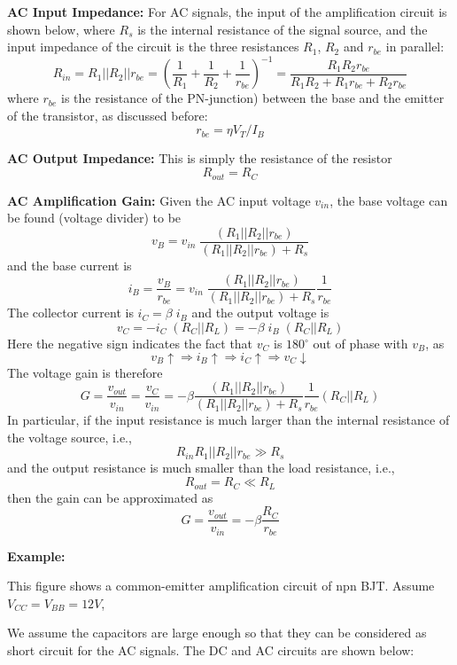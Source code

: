 
{\bf AC Input Impedance:} For AC signals, the input of the amplification
circuit is shown below, where $R_s$ is the internal resistance of the signal 
source, and the input impedance of the circuit is the three resistances $R_1$, 
$R_2$ and $r_{be}$ in parallel:
\[	R_{in}=R_1||R_2||r_{be}
	=(\frac{1}{R_1}+\frac{1}{R_2}+\frac{1}{r_{be}})^{-1}
	=\frac{R_1 R_2 r_{be}}{R_1R_2+R_1r_{be}+R_2r_{be}}	\]
where $r_{be}$ is the resistance of the PN-junction) between the base and 
the emitter of the transistor, as discussed before:
\[	r_{be}=\eta V_T/I_B	\]

{\bf AC Output Impedance:} This is simply the resistance of the resistor 
\[	R_{out}=R_C	\]

{\bf AC Amplification Gain:} Given the AC input voltage $v_{in}$, the base
voltage can be found (voltage divider) to be
\[	v_B=v_{in}\; \frac{(R_1||R_2||r_{be})}{(R_1||R_2||r_{be})+R_s}	\]
and the base current is
\[	i_B=\frac{v_B}{r_{be}}=v_{in}\;\frac{(R_1||R_2||r_{be})}{(R_1||R_2||r_{be})+R_s}\frac{1}{r_{be}}		\]
The collector current is $i_C=\beta \;i_B$ and the output voltage is
\[	v_C=-i_C\;(R_C||R_L)=-\beta\;i_B\;(R_C||R_L)	\]
Here the negative sign indicates the fact that $v_C$ is $180^\circ$ out of
phase with $v_B$, as 
\[	v_B \uparrow \Longrightarrow i_B \uparrow \Longrightarrow i_C \uparrow
	\Longrightarrow v_C \downarrow	\]
The voltage gain is therefore
\[
G=\frac{v_{out}}{v_{in}}=\frac{v_C}{v_{in}}=
	-\beta \frac{(R_1||R_2||r_{be})}{(R_1||R_2||r_{be})+R_s}
	\frac{1}{r_{be}}(R_C||R_L)	\]
In particular, if the input resistance is much larger than the internal 
resistance of the voltage source, i.e., 
\[	R_{in} R_1||R_2||r_{be} \gg  R_s	\]
and the output resistance is much smaller than the load resistance, i.e.,
\[	R_{out}=R_C \ll R_L	\]
then the gain can be approximated as
\[	G=\frac{v_{out}}{v_{in}}=-\beta \frac{R_C}{r_{be}}	\]

{\bf Example:} 


This figure shows a common-emitter amplification circuit of npn BJT. Assume
$V_{CC}=V_{BB}=12V$, 

We assume the capacitors are large enough so that they can be considered
as short circuit for the AC signals. The DC and AC circuits are shown
below:


